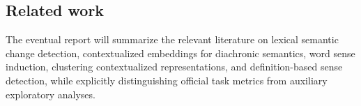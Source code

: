 \subsection{Related work}
The eventual report will summarize the relevant literature on lexical semantic change detection, contextualized embeddings for diachronic semantics, word sense induction, clustering contextualized representations, and definition-based sense detection, while explicitly distinguishing official task metrics from auxiliary exploratory analyses.
